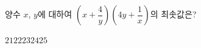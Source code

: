 양수 $x$, $y$에 대하여 $\left(x+\dfrac{4}{y}\right)\left(4y+\dfrac{1}{x}\right)$의 최솟값은?
\begin{choices32}{$21$}{$22$}{$23$}{$24$}{$25$}\end{choices32}
